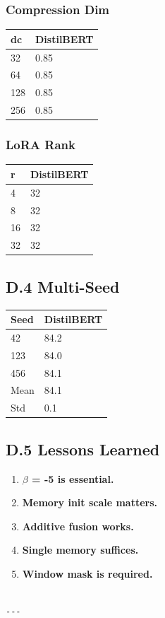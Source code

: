 \subsubsection{Compression Dim}

\begin{table}[H]
\centering
\small
\begin{tabular}{ll}
\toprule
\textbf{dc} & \textbf{DistilBERT} \\
\midrule
32 & 0.85 \\
64 & 0.85 \\
128 & 0.85 \\
256 & 0.85 \\
\bottomrule
\end{tabular}
\end{table}

\subsubsection{LoRA Rank}

\begin{table}[H]
\centering
\small
\begin{tabular}{ll}
\toprule
\textbf{r} & \textbf{DistilBERT} \\
\midrule
4 & 32 \\
8 & 32 \\
16 & 32 \\
32 & 32 \\
\bottomrule
\end{tabular}
\end{table}

\subsection{D.4 Multi-Seed}

\begin{table}[H]
\centering
\small
\begin{tabular}{ll}
\toprule
\textbf{Seed} & \textbf{DistilBERT} \\
\midrule
42 & 84.2 \\
123 & 84.0 \\
456 & 84.1 \\
Mean & 84.1 \\
Std & 0.1 \\
\bottomrule
\end{tabular}
\end{table}

\subsection{D.5 Lessons Learned}

\begin{enumerate}
\item \textbf{$\beta$ = -5 is essential.}
\item \textbf{Memory init scale matters.}
\item \textbf{Additive fusion works.}
\item \textbf{Single memory suffices.}
\item \textbf{Window mask is required.}
\end{enumerate}
\begin{lstlisting}

---
\end{lstlisting}